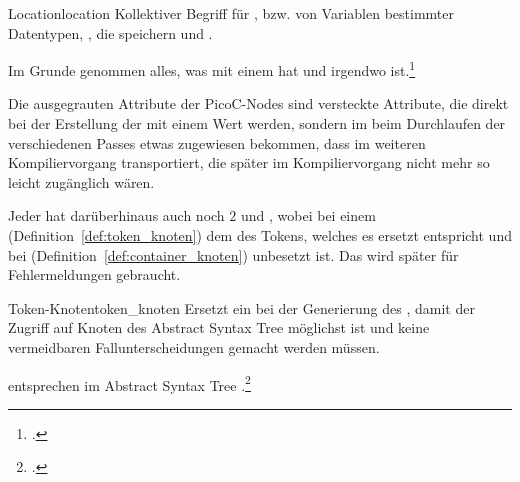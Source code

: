 \begin{Definition}{Location}{location}
  Kollektiver Begriff für ,  bzw.  von Variablen bestimmter Datentypen, , die  speichern und .

  Im Grunde genommen alles, was mit einem  hat und irgendwo  ist.\footcite{g_siek_course_2022}
\end{Definition}

\begin{Special_Paragraph}
  Die \textcolor{gray!90!black}{ausgegrauten} Attribute der PicoC-Nodes sind \textcolor{gray!90!black}{versteckte Attribute}, die  direkt bei der Erstellung der   mit einem Wert  werden, sondern im  beim Durchlaufen der verschiedenen Passes etwas zugewiesen bekommen, dass im weiteren Kompiliervorgang  transportiert, die später im Kompiliervorgang nicht mehr so leicht zugänglich wären.

  Jeder  hat darüberhinaus auch noch $2$   und , wobei  bei einem  (Definition~\ref{def:token_knoten}) dem  des Tokens, welches es ersetzt entspricht und bei  (Definition~\ref{def:container_knoten}) unbesetzt ist. Das   wird später für Fehlermeldungen gebraucht.
\end{Special_Paragraph}

\begin{Definition}{Token-Knoten}{token_knoten}
  Ersetzt ein  bei der Generierung des , damit der Zugriff auf Knoten des Abstract Syntax Tree möglichst  ist und keine vermeidbaren Fallunterscheidungen gemacht werden müssen.

   entsprechen im Abstract Syntax Tree .\footcite{thiemann_compilerbau_2021}
\end{Definition}

